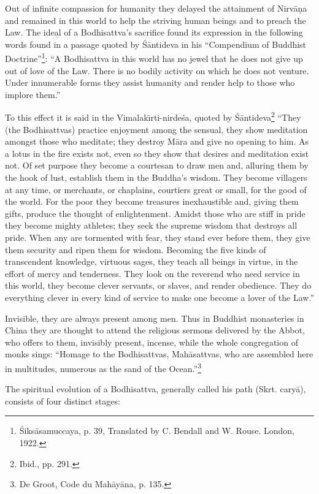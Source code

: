 \documentclass[a4paper, 12pt, oneside]{article}
\begin{document}
Out of infinite compassion for humanity they delayed the attainment of Nirv\={a}\d{n}a and remained in this world to help the striving human beings and to preach the Law. The ideal of a Bodhisattva's sacrifice found its expression in the following words found in a passage quoted by \'{S}\={a}ntideva in his ``Compendium of Buddhist Doctrine''\footnote{\'{S}iks\={a}samuccaya, p. 39, Translated by C. Bendall and W. Rouse. London, 1922.}: ``A Bodhisattva in this world has no jewel that he does not give up out of love of the Law. There is no bodily activity on which he does not venture. Under innumerable forms they assist humanity and render help to those who implore them.''

To this effect it is said in the Vimalak\={\i}rti-nirde\'{s}a, quoted by \'{S}\={a}ntideva\footnote{Ibid., pp. 291.} ``They (the Bodhisattvas) practice enjoyment among the sensual, they show meditation amongst those who meditate; they destroy M\={a}ra and give no opening to him. As a lotus in the fire exists not, even so they show that desires and meditation exist not. Of set purpose they become a courtesan to draw men and, alluring them by the hook of lust, establish them in the Buddha's wisdom. They become villagers at any time, or merchants, or chaplains, courtiers great or small, for the good of the world. For the poor they become treasures inexhaustible and, giving them gifts, produce the thought of enlightenment. Amidst those who are stiff in pride they become mighty athletes; they seek the supreme wisdom that destroys all pride. When any are tormented with fear, they stand ever before them, they give them security and ripen them for wisdom. Becoming the five kinds of transcendent knowledge, virtuous sages, they teach all beings in virtue, in the effort of mercy and tenderness. They look on the reverend who need service in this world, they become clever servants, or slaves, and render obedience. They do everything clever in every kind of service to make one become a lover of the Law.''

Invisible, they are always present among men. Thus in Buddhist monasteries in China they are thought to attend the religious sermons delivered by the Abbot, who offers to them, invisibly present, incense, while the whole congregation of monks sings: ``Homage to the Bodhisattvas, Mah\={a}sattvas, who are assembled here in multitudes, numerous as the sand of the Ocean.''\footnote{De Groot, Code du Mah\={a}y\={a}na, p. 135.}

The spiritual evolution of a Bodhisattva, generally called his path (Skrt. cary\={a}), consists of four distinct stages:
\end{document}

